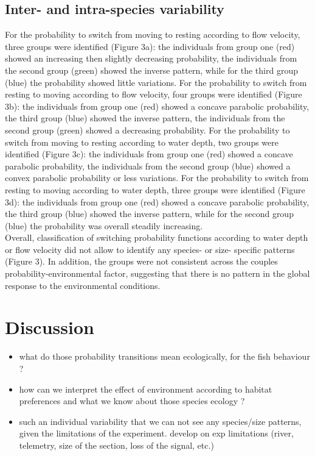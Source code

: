 \documentclass{article}
\begin{document}
\begin{linenumbers}
\subsection{Inter- and intra-species variability}
For the probability to switch from moving to resting according to flow velocity, three groups were identified (Figure 3a): the individuals from group one (red) showed an increasing then slightly decreasing probability, the individuals from the second group (green) showed the inverse pattern, while for the third group (blue) the probability showed little variations. For the probability to switch from resting to moving according to flow velocity, four groups were identified (Figure 3b): the individuals from group one (red) showed a concave parabolic probability, the third group (blue) showed the inverse pattern, the individuals from the second group (green) showed a decreasing probability. For the probability to switch from moving to resting according to water depth, two groups were identified (Figure 3c): the individuals from group one (red) showed a concave parabolic probability, the individuals from the second group (blue) showed a convex parabolic probability or less variations. For the probability to switch from resting to moving according to water depth, three groups were identified (Figure 3d): the individuals from group one (red) showed a concave parabolic probability, the third group (blue) showed the inverse pattern, while for the second group (blue) the probability was overall steadily increasing.\\
Overall, classification of switching probability functions according to water depth or flow velocity did not allow to identify any species- or size- specific patterns (Figure 3). In addition, the groups were not consistent across the couples probability-environmental factor, suggesting that there is no pattern in the global response to the environmental conditions.


\section{Discussion}
\begin{itemize}
\item what do those probability transitions mean ecologically, for the fish behaviour ?
\item how can we interpret the effect of environment according to habitat preferences and what we know about those species ecology ?
\item such an individual variability that we can not see any species/size patterns, given the limitations of the experiment. develop on exp limitations (river, telemetry, size of the section, loss of the signal, etc.)
\end{itemize}

\end{linenumbers}
\end{document}

